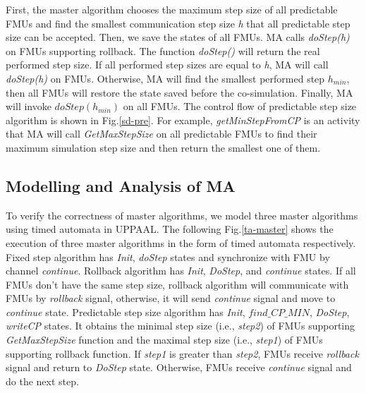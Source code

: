 First, the master algorithm chooses the maximum step size of all predictable FMUs and find the smallest communication step size \emph{h} that all predictable step size can be accepted. Then, we save the states of all FMUs. MA calls \emph{doStep(h)} on FMUs supporting rollback. The function \emph{doStep()} will return the real performed step size. If all performed step sizes are equal to \emph{h}, MA will call \emph{doStep(h)} on FMUs. Otherwise, MA will find the smallest performed step $h_{min}$, then all FMUs will restore the state saved before the co-simulation. Finally, MA will invoke $doStep(h_{min})$ on all FMUs. The control flow of predictable step size algorithm is shown in Fig.\ref{sd-pre}. For example, \emph{getMinStepFromCP} is an activity that MA will call \emph{GetMaxStepSize} on all predictable FMUs to find their maximum simulation step size and then return the smallest one of them. 

\subsection{Modelling and Analysis of MA} 
To verify the correctness of master algorithms, we model three master algorithms using timed automata in UPPAAL. The following Fig.\ref{ta-master} shows the execution of three master algorithms in the form of timed automata respectively. Fixed step algorithm has \emph{Init}, \emph{doStep} states and synchronize with FMU by channel \emph{continue}. Rollback algorithm has \emph{Init}, \emph{DoStep}, and \emph{continue} states. If all FMUs don't have the same step size, rollback algorithm will communicate with FMUs by \emph{rollback} signal, otherwise, it will send \emph{continue} signal and move to \emph{continue} state. Predictable step size algorithm has \emph{Init}, $find \_ CP \_ MIN$, \emph{DoStep}, \emph{writeCP} states. It obtains the minimal step size (i.e., \emph{step2}) of FMUs supporting \emph{GetMaxStepSize} function and the maximal step size (i.e., \emph{step1}) of FMUs supporting rollback function. If \emph{step1} is greater than \emph{step2}, FMUs receive \emph{rollback} signal and return to \emph{DoStep} state. Otherwise, FMUs receive \emph{continue} signal and do the next step.  



